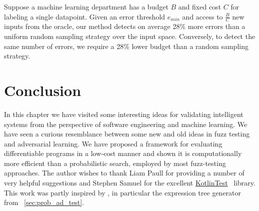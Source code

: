 Suppose a machine learning department has a budget $B$ and fixed cost $C$ for labeling a single datapoint. Given an error threshold $e_{min}$ and access to $\frac{B}{C}$ new inputs from the oracle, our method detects on average 28\% more errors than a uniform random sampling strategy over the input space. Conversely, to detect the same number of errors, we require a 28\% lower budget than a random sampling strategy.

\section{Conclusion}

In this chapter we have visited some interesting ideas for validating intelligent systems from the perspective of software engineering and machine learning. We have seen a curious resemblance between some new and old ideas in fuzz testing and adversarial learning. We have proposed a framework for evaluating differentiable programs in a low-cost manner and shown it is computationally more efficient than a probabilistic search, employed by most fuzz-testing approaches. The author wishes to thank Liam Paull for providing a number of very helpful suggestions and Stephen Samuel for the excellent \href{https://github.com/kotlintest/kotlintest}{KotlinTest}~\citep{kotlintest} library. This work was partly inspired by \citet{lample2019deep}, in particular the expression tree generator from ~\autoref{sec:prob_ad_test}.